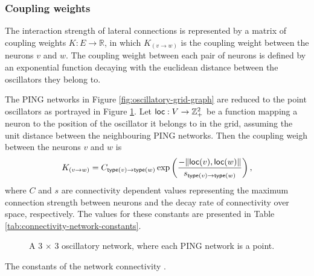 \subsubsection{Coupling weights}
\label{sec:coupling-weights}

The interaction strength of lateral connections is represented by a matrix of coupling weights $K: E \to \mathbb{R}$, in which $K_{(v \to w)}$ is the coupling weight between the neurons $v$ and $w$. 
The coupling weight between each pair of neurons is defined by an exponential function decaying with the euclidean distance between the oscillators they belong to. 

The PING networks in Figure \ref{fig:oscillatory-grid-graph} are reduced to the point oscillators as portrayed in Figure \ref{fig:oscillatory-point-grid}. 
Let $\mathsf{loc}: V \to \mathbb{Z}_+^2$ be a function mapping a neuron to the position of the oscillator it belongs to in the grid, assuming the unit distance between the neighbouring PING networks. Then the coupling weigh between the neurons $v$ and $w$ is
\begin{equation}
    K_{(v \to w)} = C_{\mathsf{type}(v) \to \mathsf{type}(w)} \exp \left( \frac{-\| \mathsf{loc}(v), \mathsf{loc}(w) \|}{s_{\mathsf{type}(v) \to \mathsf{type}(w)}} \right),
    \label{eq:coupling-weights}
\end{equation}
where $C$ and $s$ are connectivity dependent values representing the maximum connection strength between neurons and the decay rate of connectivity over space, respectively. The values for these constants are presented in Table \ref{tab:connectivity-network-constants}.

\begin{figure}[!htp]
    \centering
    
    \caption[Point-PING oscillatory network]{A 3 $\times$ 3 oscillatory network, where each PING network is a point.}
    \label{fig:oscillatory-point-grid}
\end{figure}

\begin{table}[!htp] 
    \centering
    
    \caption[Constants of the network connectivity]{The constants of the network connectivity \cite{Lowet2015}.}
    \label{tab:connectivity-network-constants}
\end{table}